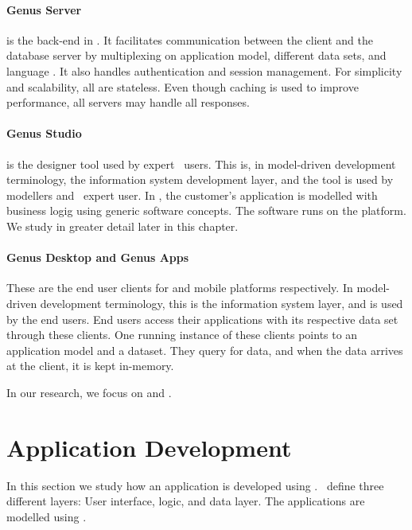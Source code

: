 \paragraph{Genus Server}
\label{par:Genus Server}
 is the back-end in \gap. It facilitates communication between the client and the database server by multiplexing on application model, different data sets, and language . It also handles authentication and session management. For simplicity and scalability, all  are stateless. Even though caching is used to improve performance, all servers may handle all responses. 

\paragraph{Genus Studio}
\label{par:Genus Studio}
 is the designer tool used by expert \gap~users. This is, in model-driven development terminology, the information system development layer, and the tool is used by modellers and \gap~expert user. In , the customer's application is modelled with business logig using generic software concepts. The software runs on the  platform. We study  in greater detail later in this chapter.

\paragraph{Genus Desktop and Genus Apps}
\label{par:Genus Desktop and Genus Apps}
These are the end user clients for  and mobile platforms respectively. In model-driven development terminology, this is the information system layer, and is used by the end users. End users access their applications with its respective data set through these clients. One running instance of these clients points to an application model and a dataset. They query  for data, and when the data arrives at the client, it is kept in-memory.

In our research, we focus on  and .


\section{Application Development}
\label{sec:Application Development}
In this section we study how an application is developed using \gap. \genus~define three different layers: User interface, logic, and data layer. The applications are modelled using .

